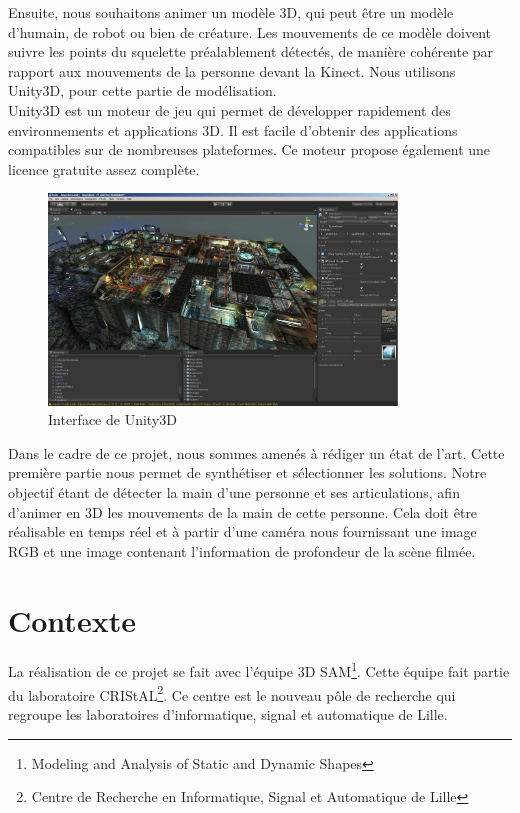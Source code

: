 Ensuite, nous souhaitons animer un modèle 3D, qui peut être un modèle 
d'humain, de robot ou bien de créature. Les mouvements de ce modèle 
doivent suivre les points du squelette préalablement détectés, de 
manière cohérente par rapport aux mouvements de la personne devant la 
Kinect. Nous utilisons Unity3D, pour cette partie de 
modélisation.\\

Unity3D est un moteur de jeu qui permet de développer rapidement des 
environnements et applications 3D. Il est facile d'obtenir des 
applications compatibles sur de nombreuses plateformes. Ce moteur 
propose également une licence gratuite assez complète.\\

\begin{figure}[H]
  \begin{center}
    \includegraphics[width=350px]{images/Unity3D.jpg}
    \caption{Interface de Unity3D}
  \end{center}
\end{figure}

Dans le cadre de ce projet, nous sommes amenés à rédiger un état de
l'art. Cette première partie nous permet de synthétiser et sélectionner 
les solutions. Notre objectif étant de détecter la main d'une personne 
et ses articulations, afin d'animer en 3D les mouvements de la main de 
cette personne. Cela doit être réalisable en temps réel et à partir d'une caméra nous 
fournissant une image RGB et une image contenant l'information de 
profondeur de la scène filmée.\\

\section{Contexte}
La réalisation de ce projet se fait avec l'équipe 3D 
SAM\footnote{Modeling and Analysis of Static and Dynamic Shapes}. 
Cette équipe fait partie du laboratoire CRIStAL\footnote{Centre de Recherche 
en Informatique, Signal et Automatique de Lille}. Ce centre est le 
nouveau pôle de recherche qui regroupe les laboratoires d'informatique, 
signal et automatique de Lille.\\

